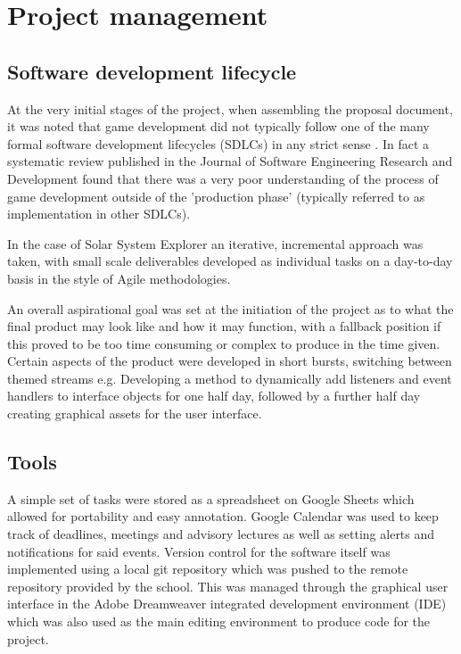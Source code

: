 \documentclass[twoside]{bhamthesis}
\begin{document}
\section{Project management}

\subsection{Software development lifecycle}
At the very initial stages of the project, when assembling the proposal document, it was noted that game development did not typically follow one of the many formal software development lifecycles (SDLCs) in any strict sense \cite{ramadan_game_2013}. In fact a systematic review published in the Journal of Software Engineering Research and Development found that there was a very poor understanding of the process of game development outside of the 'production phase' (typically referred to as implementation in other SDLCs).

In the case of Solar System Explorer an iterative, incremental approach was taken, with small scale deliverables developed as individual tasks on a day-to-day basis in the style of Agile methodologies.

An overall aspirational goal was set at the initiation of the project as to what the final product may look like and how it may function, with a fallback position if this proved to be too time consuming or complex to produce in the time given. Certain aspects of the product were developed in short bursts, switching between themed streams e.g. Developing a method to dynamically add listeners and event handlers to interface objects for one half day, followed by a further half day creating graphical assets for the user interface.


\subsection{Tools}
A simple set of tasks were stored as a spreadsheet on Google Sheets which allowed for portability and easy annotation. Google Calendar was used to keep track of deadlines, meetings and advisory lectures as well as setting alerts and notifications for said events. Version control for the software itself was implemented using a local git repository which was pushed to the remote repository provided by the school. This was managed through the graphical user interface in the Adobe Dreamweaver integrated development environment (IDE) which was also used as the main editing environment to produce code for the project.
\end{document}
